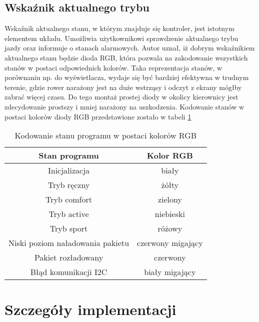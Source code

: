 \subsection{Wskaźnik aktualnego trybu}
Wskaźnik aktualnego stanu, w którym znajduje się kontroler, jest istotnym elementem układu. Umożliwia  użytkownikowi sprawdzenie aktualnego trybu jazdy oraz informuje o stanach alarmowych. Autor uznał, iż dobrym wskaźnikiem aktualnego stanu będzie dioda RGB, która pozwala na zakodowanie wszystkich stanów w postaci odpowiednich kolorów. Taka reprezentacja stanów, w porównaniu np. do wyświetlacza, wydaje się być bardziej efektywna w trudnym terenie, gdzie rower narażony jest na duże wstrząsy i odczyt z ekrany mógłby zabrać więcej czasu. Do tego montaż prostej diody w okolicy kierownicy jest zdecydowanie prostszy i mniej narażony na uszkodzenia.
Kodowanie stanów w postaci kolorów diody RGB przedstawione zostało w tabeli \ref{tab:rgb}
\begin{table}[h]
    \caption{Kodowanie stanu programu w postaci kolorów RGB}
    \begin{center}
		\label{tab:rgb}
		\begin{tabular}{|c|c|}
			\hline
 			\textbf{Stan programu} & \textbf{Kolor RGB}\\
 			\hline
 			Inicjalizacja & biały\\  
 			\hline
			Tryb ręczny & żółty\\
			\hline
			Tryb comfort & zielony \\  
			\hline
			Tryb active & niebieski\\  
			\hline
			Tryb sport & różowy \\  
			\hline
			Niski poziom naładowania pakietu & czerwony migający\\  
			\hline
			Pakiet rozładowany & czerwony \\  
			\hline
			Błąd komunikacji I2C & biały migający\\  
			\hline
		\end{tabular}
	\end{center}
\end{table}


\section{Szczegóły implementacji}
